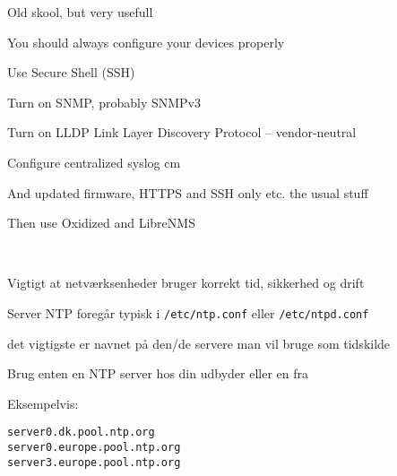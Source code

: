 \documentclass[Screen16to9,17pt]{foils}
\begin{document}


Old skool, but very usefull 






\begin{slidelist}
\item You should always configure your devices properly
\item Use Secure Shell (SSH)
\item Turn on SNMP, probably SNMPv3
\item Turn on LLDP Link Layer Discovery Protocol -- vendor-neutral\\
{\small{}}
\item Configure centralized syslog
 cm
\item And updated firmware, HTTPS and SSH only etc. the usual stuff
\end{slidelist}

Then use Oxidized and LibreNMS



{~}

\begin{list1}
\item Vigtigt at netværksenheder bruger korrekt tid, sikkerhed og drift
\item Server NTP foregår typisk i \verb+/etc/ntp.conf+ eller \verb+/etc/ntpd.conf+
\item det vigtigste er navnet på den/de servere man vil bruge som tidskilde
\item Brug enten en NTP server hos din udbyder eller en fra 
\item Eksempelvis:
\end{list1}

\begin{alltt}
server 0.dk.pool.ntp.org
server 0.europe.pool.ntp.org
server 3.europe.pool.ntp.org

\end{alltt}
\end{document}
